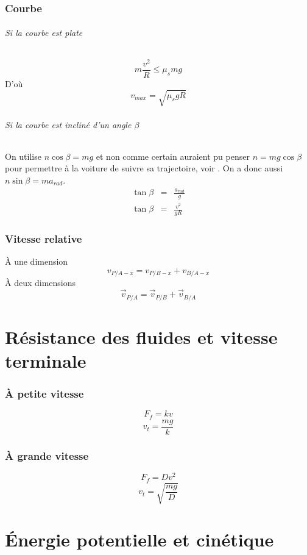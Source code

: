 \section{Courbe}
\paragraph{Si la courbe est plate}
\[ m\frac{v^2}{R} \leq \mu_smg \]
D'où
\[ v_{max} = \sqrt{\mu_s g R} \]
\paragraph{Si la courbe est incliné d'un angle $\beta$}
On utilise $n\cos\beta = mg$ et non comme certain auraient pu penser $n = mg\cos\beta$ pour permettre à la voiture de suivre sa trajectoire, voir \cite[p.~157]{young}.
On a donc aussi $n\sin\beta = ma_{rad}$.
\begin{eqnarray*}
	\tan{\beta} & = & \frac{a_{rad}}{g}\\
	\tan{\beta} & = & \frac{v^2}{gR}
\end{eqnarray*}

\section{Vitesse relative}
À une dimension
\[ v_{P/A-x} = v_{P/B-x} + v_{B/A-x} \]
À deux dimensions
\[ \vec{v}_{P/A} = \vec{v}_{P/B} + \vec{v}_{B/A} \]

\part{Résistance des fluides et vitesse terminale}
\section{À petite vitesse}
\[ F_f = kv \]
\[ v_t = \frac{mg}{k} \]
\section{À grande vitesse}
\[ F_f = Dv^2 \]
\[ v_t = \sqrt{ \frac{mg}{D} }\]

\part{Énergie potentielle et cinétique}
